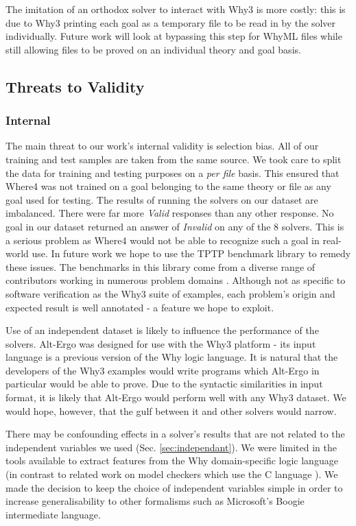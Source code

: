 \documentclass[runningheads,a4paper]{llncs}
\begin{document}
The imitation of an orthodox solver to interact with \textsf{Why3} is more costly: this is due to \textsf{Why3} printing each goal as a temporary file to be read in by the solver individually. Future work will look at bypassing this step for WhyML files while still allowing files to be proved on an individual theory and goal basis.    

\subsection{Threats to Validity}

\subsubsection{Internal}
\label{sec:internal}

The main threat to our work's internal validity is selection bias. All of our training and test samples are taken from the same source. We took care to split the data for training and testing purposes on a \textit{per file} basis. This ensured that \textsf{Where4} was not trained on a goal belonging to the same theory or file as any goal used for testing. 
The results of running the solvers on our dataset are imbalanced. There were far more \textit{Valid} responses than any other response. No goal in our dataset returned an answer of \textit{Invalid} on any of the 8 solvers. This is a serious problem as \textsf{Where4} would not be able to recognize such a goal in real-world use. In future work we hope to use the TPTP benchmark library to remedy these issues. The benchmarks in this library come from a diverse range of contributors working in numerous problem domains \cite{Sutcliffe200139}. Although not as specific to software verification as the \textsf{Why3} suite of examples, each problem's origin and expected result is well annotated - a feature we hope to exploit.   

Use of an independent dataset is likely to influence the performance of the solvers. Alt-Ergo was designed for use with the \textsf{Why3} platform - its input language is a previous version of the Why logic language. It is natural that the developers of the \textsf{Why3} examples would write programs which Alt-Ergo in particular would be able to prove. Due to the syntactic similarities in input format, it is likely that Alt-Ergo would perform well with any \textsf{Why3} dataset. We would hope, however, that the gulf between it and other solvers would narrow.

There may be confounding effects in a solver's results that are not related to the independent variables we used (Sec. \ref{sec:independant}). We were limited in the tools available to extract features from the Why domain-specific logic language (in contrast to related work on model checkers which use the C language \cite{DPVZ15:CAV}\cite{MUX}). We made the decision to keep the choice of independent variables simple in order to increase generalisability to other formalisms such as Microsoft's Boogie \cite{Boogie} intermediate language.  
\end{document}
